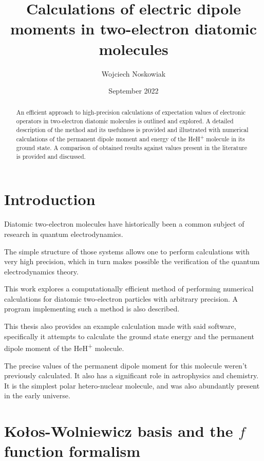 \documentclass{pracalicmgr}
\author{Wojciech Noskowiak}
\title{Calculations of electric dipole moments in two-electron diatomic molecules}
\date{September 2022}
\begin{document}
\maketitle
\let\cleardoublepage\clearpage

\begin{abstract}
    An efficient approach to high-precision calculations of expectation values of electronic operators in two-electron diatomic molecules is outlined and explored. A detailed description of the method and its usefulness is provided and illustrated with numerical calculations of the permanent dipole moment and energy of the HeH\textsuperscript{+} molecule in its ground state. A comparison of obtained results against values present in the literature is provided and discussed.
\end{abstract}

\tableofcontents

\newpage

\chapter*{Introduction}
\label{sec:intro}

Diatomic two-electron molecules have historically been a common subject of research in quantum electrodynamics.

The simple structure of those systems allows one to perform calculations with very high precision, which in turn makes possible the verification of the quantum electrodynamics theory. 

This work explores a computationally efficient method of performing numerical calculations for diatomic two-electron particles with arbitrary precision. A program implementing such a method is also described. 

This thesis also provides an example calculation made with said software, specifically it attempts to calculate the ground state energy and the permanent dipole moment of the HeH\textsuperscript{+} molecule. 

The precise values of the permanent dipole moment for this molecule weren't previously calculated. It also has a significant role in astrophysics and chemistry. It is the simplest polar hetero-nuclear molecule, and was also abundantly present in the early universe. \cite{chem} \cite{astro}
 

\chapter{Kołos-Wolniewicz basis and the \texorpdfstring{$f$}{TEXT} function formalism}
\label{rob}
\end{document}
